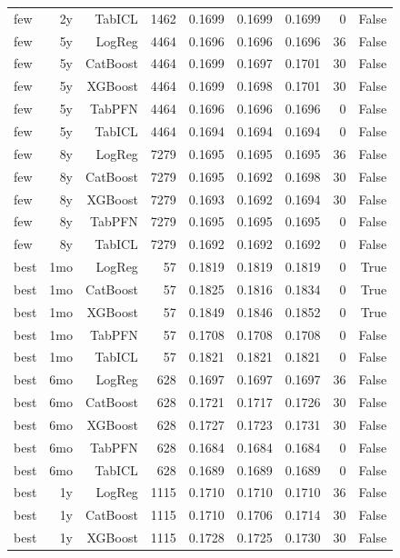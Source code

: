 \begin{table}[t]
\begin{tabular}{lrrrrrrrr}
  few & 2y & TabICL & 1462 & 0.1699 & 0.1699 & 0.1699 & 0 & False \\
  few & 5y & LogReg & 4464 & 0.1696 & 0.1696 & 0.1696 & 36 & False \\
  few & 5y & CatBoost & 4464 & 0.1699 & 0.1697 & 0.1701 & 30 & False \\
  few & 5y & XGBoost & 4464 & 0.1699 & 0.1698 & 0.1701 & 30 & False \\
  few & 5y & TabPFN & 4464 & 0.1696 & 0.1696 & 0.1696 & 0 & False \\
  few & 5y & TabICL & 4464 & 0.1694 & 0.1694 & 0.1694 & 0 & False \\
  few & 8y & LogReg & 7279 & 0.1695 & 0.1695 & 0.1695 & 36 & False \\
  few & 8y & CatBoost & 7279 & 0.1695 & 0.1692 & 0.1698 & 30 & False \\
  few & 8y & XGBoost & 7279 & 0.1693 & 0.1692 & 0.1694 & 30 & False \\
  few & 8y & TabPFN & 7279 & 0.1695 & 0.1695 & 0.1695 & 0 & False \\
  few & 8y & TabICL & 7279 & 0.1692 & 0.1692 & 0.1692 & 0 & False \\
  best & 1mo & LogReg & 57 & 0.1819 & 0.1819 & 0.1819 & 0 & True \\
  best & 1mo & CatBoost & 57 & 0.1825 & 0.1816 & 0.1834 & 0 & True \\
  best & 1mo & XGBoost & 57 & 0.1849 & 0.1846 & 0.1852 & 0 & True \\
  best & 1mo & TabPFN & 57 & 0.1708 & 0.1708 & 0.1708 & 0 & False \\
  best & 1mo & TabICL & 57 & 0.1821 & 0.1821 & 0.1821 & 0 & False \\
  best & 6mo & LogReg & 628 & 0.1697 & 0.1697 & 0.1697 & 36 & False \\
  best & 6mo & CatBoost & 628 & 0.1721 & 0.1717 & 0.1726 & 30 & False \\
  best & 6mo & XGBoost & 628 & 0.1727 & 0.1723 & 0.1731 & 30 & False \\
  best & 6mo & TabPFN & 628 & 0.1684 & 0.1684 & 0.1684 & 0 & False \\
  best & 6mo & TabICL & 628 & 0.1689 & 0.1689 & 0.1689 & 0 & False \\
  best & 1y & LogReg & 1115 & 0.1710 & 0.1710 & 0.1710 & 36 & False \\
  best & 1y & CatBoost & 1115 & 0.1710 & 0.1706 & 0.1714 & 30 & False \\
  best & 1y & XGBoost & 1115 & 0.1728 & 0.1725 & 0.1730 & 30 & False \\

\end{tabular}
\end{table}
